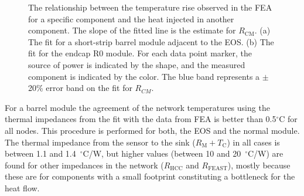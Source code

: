 \begin{figure}[ht]
\centering
{}
\caption{The relationship between the temperature rise observed in the FEA for a specific component and the heat injected in another component. The slope of the fitted line is the estimate for $R_\text{CM}$.
(a) The fit for a short-strip barrel module adjacent to the EOS. (b) The fit for the endcap R0 module.
For each data point marker, the source of power is indicated by the shape, and the measured component is indicated
by the color.
The blue band represents a $\pm$20\% error band on the fit for $R_{CM}$.
}
\label{fig:solving_for_Rcm}
\end{figure}


For a barrel module the agreement of the network temperatures using the thermal impedances from the fit with the data from FEA is better than 0.5$^\circ$C for all nodes. This procedure is performed for both, the EOS and the normal module. The thermal impedance from the sensor to the sink ($R_\text{M}+T_\text{C}$) in all cases is between 1.1 and 1.4~$^\circ$C/W, but higher values (between 10 and 20~$^\circ$C/W) are found for other impedances in the network ($R_\text{HCC}$ and $R_\text{FEAST}$), mostly because these are for components with a small footprint constituting a bottleneck for the heat flow.

